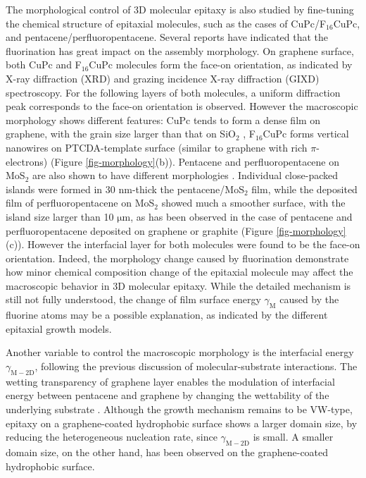 The morphological control of 3D molecular epitaxy is also studied by
fine-tuning the chemical structure of epitaxial molecules, such as the
cases of CuPc/F\(_{\text{16}}\)CuPc, and pentacene/perfluoropentacene. Several
reports have indicated that the fluorination has great impact on the
assembly morphology. On graphene surface, both CuPc
\cite{Singha_Roy_2012_CuPc_gr_glass,Xiao_2013_jacs_CuPc_gr} and
F\(_{\text{16}}\)CuPc \cite{Zhong_2012_gr_F16_pn_junc} molecules form the face-on
orientation, as indicated by X-ray diffraction (XRD) and grazing
incidence X-ray diffraction (GIXD) spectroscopy. For the following
layers of both molecules, a uniform diffraction peak corresponds to
the face-on orientation is observed. However the macroscopic
morphology shows different features: CuPc tends to form a dense film
on graphene, with the grain size larger than that on SiO\(_{\text{2}}\)
\cite{Singha_Roy_2012_CuPc_gr_glass,Xiao_2013_jacs_CuPc_gr}, F\(_{\text{16}}\)CuPc
forms vertical nanowires on PTCDA-template surface (similar to
graphene with rich \(\pi\)-electrons) \cite{Yang_2011_F16CUPc_nanowire}
(Figure \ref{fig-morphology}(b)).  Pentacene and perfluoropentacene on
MoS\(_{\text{2}}\) are also shown to have different morphologies
\cite{Breuer_2016_acnene_mos2}. Individual close-packed islands were
formed in 30 nm-thick the pentacene/MoS\(_{\text{2}}\) film, while the deposited
film of perfluoropentacene on MoS\(_{\text{2}}\) showed much a smoother surface,
with the island size larger than 10 \(\mathrm{\mu m}\), as has been
observed in the case of pentacene and perfluoropentacene deposited on
graphene or graphite \cite{Salzmann_2012_fpen_gr,Breuer_2011_pent_graph}
(Figure \ref{fig-morphology}(c)). However the interfacial layer for both
molecules were found to be the face-on orientation. Indeed, the
morphology change caused by fluorination demonstrate how minor
chemical composition change of the epitaxial molecule may affect the
macroscopic behavior in 3D molecular epitaxy. While the detailed
mechanism is still not fully understood, the change of film surface
energy \(\gamma_{\mathrm{M}}\) caused by the fluorine atoms may be a
possible explanation, as indicated by the different
epitaxial growth models.

Another variable to control the macroscopic morphology is the
interfacial energy \(\gamma_{\mathrm{M-2D}}\), following the previous
discussion of molecular-substrate interactions. The wetting
transparency of graphene layer enables the modulation of interfacial
energy between pentacene and graphene by changing the wettability of
the underlying substrate \cite{Nguyen_2015_pent_gr_wett}. Although the
growth mechanism remains to be VW-type, epitaxy on a graphene-coated
hydrophobic surface shows a larger domain size, by reducing the
heterogeneous nucleation rate, since \(\gamma_{\mathrm{M-2D}}\) is
small. A smaller domain size, on the other hand, has been observed on
the graphene-coated hydrophobic surface.


